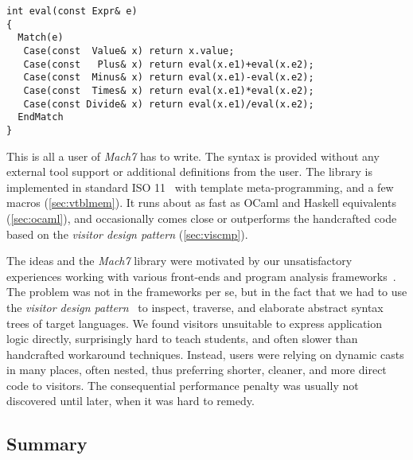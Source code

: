 
\begin{lstlisting}[columns=flexible]
int eval(const Expr& e)
{
  Match(e)
   Case(const  Value& x) return x.value;
   Case(const   Plus& x) return eval(x.e1)+eval(x.e2);
   Case(const  Minus& x) return eval(x.e1)-eval(x.e2);
   Case(const  Times& x) return eval(x.e1)*eval(x.e2);
   Case(const Divide& x) return eval(x.e1)/eval(x.e2);
  EndMatch
}
\end{lstlisting}

\noindent
This is all a user of \emph{Mach7} has to write.
The syntax is provided without any external tool support or 
additional definitions from the user. The library is implemented in
standard ISO \Cpp{}11~\cite{C++11} with template meta-programming, 
and a few macros (\textsection\ref{sec:vtblmem}). It runs 
about as fast as OCaml and Haskell equivalents (\textsection\ref{sec:ocaml}),
and occasionally
comes close or 
outperforms the handcrafted \Cpp{} code based on the \emph{visitor design pattern} 
(\textsection\ref{sec:viscmp}).

The ideas and the 
\emph{Mach7} library were motivated by our unsatisfactory experiences working 
with various \Cpp{} front-ends and program analysis frameworks~\cite{Pivot09,gdr-2012:liz,Phoenix,Clang}. 
The problem was not in the frameworks per se, but in the fact that we had to use
the \emph{visitor design pattern}~\cite{DesignPatterns1993} to inspect, traverse, and 
elaborate abstract syntax trees of target languages. We found visitors 
unsuitable to express application logic directly, surprisingly hard to teach 
students, and often slower than handcrafted workaround techniques. Instead, 
users were relying on dynamic casts in many places, often nested, thus preferring 
shorter, cleaner, and more direct code to visitors. The consequential 
performance penalty was usually not discovered until later, when it was hard to 
remedy.

\subsection{Summary}

